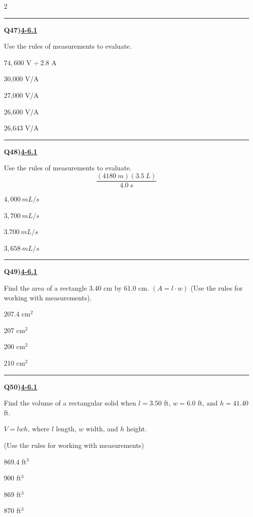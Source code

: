 \documentclass[11pt]{article}
\newenvironment{Qbox}[2]{%
  \par\medskip\noindent\begin{minipage}{\linewidth}%
  \hrule\medskip%
  \textbf{Q#1)}\hfill\textbf{\underline{#2}}\par\smallskip%
}{\par\end{minipage}\par\medskip}
\begin{document}
\begin{multicols}{2}
\begin{Qbox}{47}{4-6.1}
Use the rules of measurements to evaluate.\par\medskip $74{,}600$ V $\div\ 2.8$ A
\begin{choices}
  \item 30,000 V/A
  \item 27,000 V/A
  \item 26,600 V/A
  \item 26,643 V/A
\end{choices}
\end{Qbox}

\begin{Qbox}{48}{4-6.1}
Use the rules of measurements to evaluate.\[ \frac{(4180\ m)(3.5\ L)}{4.0\ s} \]
\begin{choices}
  \item $4{,}000\ mL/s$
  \item $3{,}700\ mL/s$
  \item $3.700\ mL/s$
  \item $3{,}658\ mL/s$
\end{choices}
\end{Qbox}

\begin{Qbox}{49}{4-6.1}
Find the area of a rectangle 3.40 cm by 61.0 cm. $(A=l\cdot w)$ (Use the rules for working with measurements).
\begin{choices}
  \item 207.4 cm$^2$
  \item 207 cm$^2$
  \item 200 cm$^2$
  \item 210 cm$^2$
\end{choices}
\end{Qbox}

\begin{Qbox}{50}{4-6.1}
Find the volume of a rectangular solid when $l=3.50$ ft, $w=6.0$ ft, and $h=41.40$ ft.\par\medskip $V=lwh$, where $l$ length, $w$ width, and $h$ height.\par\medskip (Use the rules for working with measurements)
\begin{choices}
  \item 869.4 ft$^3$
  \item 900 ft$^3$
  \item 869 ft$^3$
  \item 870 ft$^3$
\end{choices}
\end{Qbox}

\end{multicols}
\end{document}
